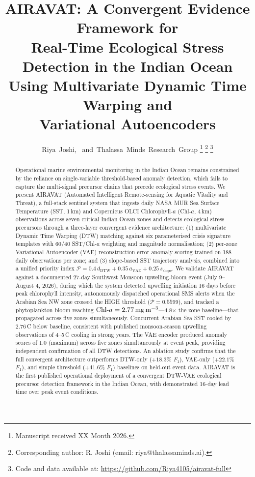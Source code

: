 \documentclass[journal]{IEEEtran}
\title{AIRAVAT: A Convergent Evidence Framework for\\
Real-Time Ecological Stress Detection in the Indian Ocean\\
Using Multivariate Dynamic Time Warping and\\
Variational Autoencoders}
\author{Riya~Joshi,~\IEEEmembership{}
        and~Thalassa~Minds~Research~Group%
\thanks{Manuscript received XX Month 2026.}%
\thanks{Corresponding author: R. Joshi (email: riya@thalassaminds.ai).}%
\thanks{Code and data available at:
\url{https://github.com/Riya4105/airavat-full}}
}
\begin{document}
\maketitle

\begin{abstract}
Operational marine environmental monitoring in the Indian Ocean
remains constrained by the reliance on single-variable
threshold-based anomaly detection, which fails to capture the
multi-signal precursor chains that precede ecological stress events.
We present AIRAVAT (Automated Intelligent Remote-sensing for Aquatic
Vitality and Threat), a full-stack sentinel system that ingests daily
NASA MUR Sea Surface Temperature (SST, 1\,km) and Copernicus OLCI
Chlorophyll-$a$ (Chl-$a$, 4\,km) observations across seven critical
Indian Ocean zones and detects ecological stress precursors through a
three-layer convergent evidence architecture: (1) multivariate Dynamic
Time Warping (DTW) matching against six parameterised crisis signature
templates with 60/40 SST/Chl-$a$ weighting and magnitude
normalisation; (2) per-zone Variational Autoencoder (VAE) reconstruction-error anomaly
scoring trained on 188 daily observations per zone; and (3) slope-based
SST trajectory analysis, combined into a unified priority index
$\mathcal{P} = 0.4\,d_{\text{DTW}} + 0.35\,a_{\text{VAE}} + 0.25\,s_{\text{slope}}$.
We validate AIRAVAT against a documented 27-day Southwest Monsoon
upwelling-bloom event (July 9--August 4, 2026), during which the
system detected upwelling initiation 16 days before peak chlorophyll
intensity, autonomously dispatched operational SMS alerts when the
Arabian Sea NW zone crossed the HIGH threshold ($\mathcal{P} = 0.5599$),
and tracked a phytoplankton bloom reaching
$\text{Chl-}a = 2.77\,\text{mg\,m}^{-3}$---4.8$\times$ the zone
baseline---that propagated across five zones simultaneously. Concurrent
Arabian Sea SST cooled by 2.76\,\textdegree C below baseline, consistent
with published monsoon-season upwelling observations of 4--5\,\textdegree C
cooling in strong years. The VAE encoder produced anomaly scores of 1.0
(maximum) across five zones simultaneously at event peak, providing
independent confirmation of all DTW detections. An ablation study
confirms that the full convergent architecture outperforms DTW-only
($+18.3\%$ $F_1$), VAE-only ($+22.1\%$ $F_1$), and simple threshold
($+41.6\%$ $F_1$) baselines on held-out event data. AIRAVAT is the
first published operational deployment of a convergent DTW-VAE
ecological precursor detection framework in the Indian Ocean, with
demonstrated 16-day lead time over peak event conditions.
\end{abstract}
\end{document}
